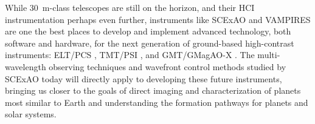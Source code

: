While \SI{30}{\meter}-class telescopes are still on the horizon, and their HCI instrumentation perhaps even further, instruments like SCExAO and VAMPIRES are one the best places to develop and implement advanced technology, both software and hardware, for the next generation of ground-based high-contrast instruments: ELT/PCS \citep{kasper_pcs_2021}, TMT/PSI \citep{fitzgerald_planetary_2019}, and GMT/GMagAO-X \citep{kautz_gmagao-x_2023}. The multi-wavelength observing techniques and wavefront control methods studied by SCExAO today will directly apply to developing these future instruments, bringing us closer to the goals of direct imaging and characterization of planets most similar to Earth and understanding the formation pathways for planets and solar systems.